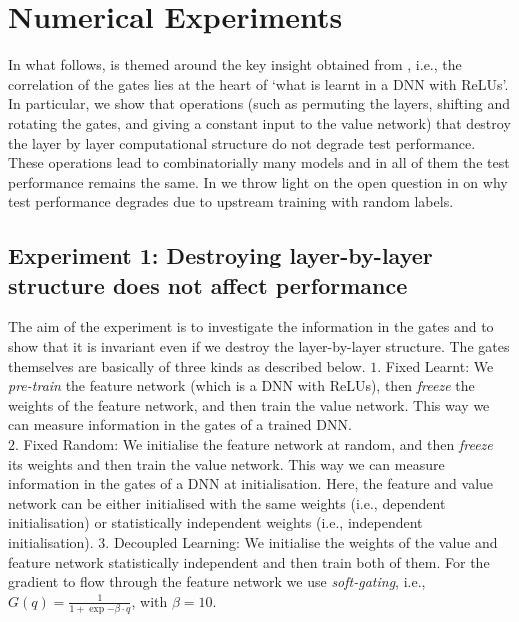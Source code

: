 \section{Numerical Experiments}\label{sec:exp} 
In what follows,  is themed around the key insight obtained from , i.e., the correlation of the gates lies at the heart of `what is learnt in a DNN with ReLUs'. In particular, we show that operations (such as permuting the layers, shifting and rotating the gates, and giving a constant input to the value network) that destroy the layer by layer computational structure do not degrade test performance. These operations lead to combinatorially many models and in all of them the test performance remains the same. In  we throw light on the open question in  on why test performance degrades due to upstream training with random labels.
\subsection{Experiment 1: Destroying layer-by-layer structure does not affect performance}\label{sec:exp1}
The aim of the experiment is to investigate the information in the gates and to show that it is invariant even if we destroy the layer-by-layer structure. The gates themselves are basically of three kinds as described below.
$1.$ Fixed Learnt: We \emph{pre-train} the feature network (which is a DNN with ReLUs), then \emph{freeze} the weights of the feature network, and then train the value network. This way we can measure information in the gates of a trained DNN.\\
$2.$ Fixed Random: We initialise the feature network at random, and then \emph{freeze} its weights and then train the value network. This way we can measure information in the gates of a DNN at initialisation. Here, the feature and value network can be either initialised with the same weights (i.e., dependent initialisation) or statistically independent weights (i.e., independent initialisation).
$3.$ Decoupled Learning: We initialise the weights of the value and feature network statistically independent and then train both of them. For the gradient to flow through the feature network we use \emph{soft-gating}, i.e., $G(q)=\frac{1}{1+\exp{-\beta\cdot q}}$, with $\beta=10$. 




